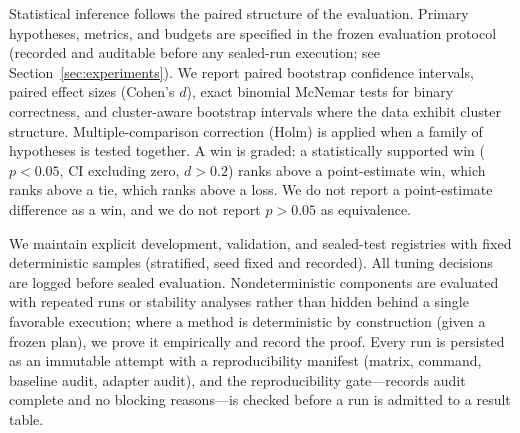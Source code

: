 Statistical inference follows the paired structure of the evaluation. Primary
hypotheses, metrics, and budgets are specified in the frozen evaluation protocol
(recorded and auditable before any sealed-run execution; see
Section~\ref{sec:experiments}). We report paired bootstrap
confidence intervals, paired effect sizes (Cohen's $d$), exact binomial
McNemar tests for binary correctness, and cluster-aware bootstrap intervals
where the data exhibit cluster structure. Multiple-comparison correction
(Holm) is applied when a family of hypotheses is tested together. A win is
graded: a statistically supported win ($p<0.05$, CI excluding zero, $d>0.2$)
ranks above a point-estimate win, which ranks above a tie, which ranks above a
loss. We do not report a point-estimate difference as a win, and we do not
report $p>0.05$ as equivalence.

We maintain explicit development, validation, and sealed-test registries with
fixed deterministic samples (stratified, seed fixed and recorded). All tuning
decisions are logged before sealed evaluation. Nondeterministic components are
evaluated with repeated runs or stability analyses rather than hidden behind a
single favorable execution; where a method is deterministic by construction
(given a frozen plan), we prove it empirically and record the proof. Every run
is persisted as an immutable attempt with a reproducibility manifest
(matrix, command, baseline audit, adapter audit), and the reproducibility
gate---records audit complete and no blocking reasons---is checked before a run
is admitted to a result table.
